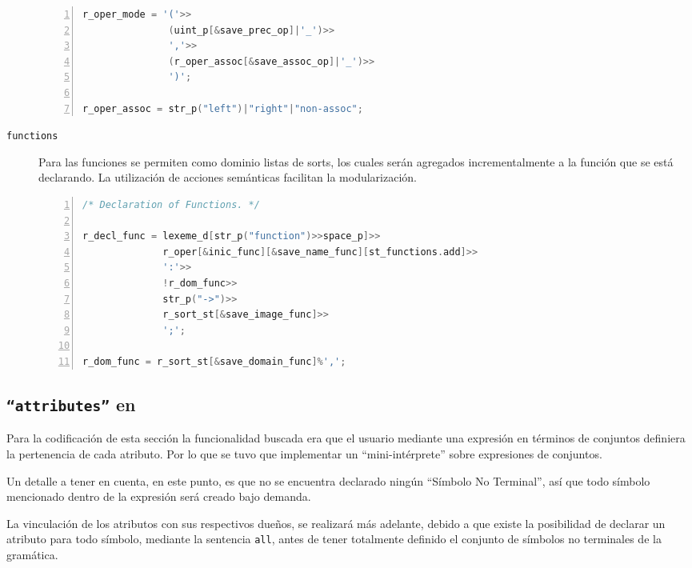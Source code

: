 \begin{description}
\begin{lstlisting}[language=C++, basicstyle=\scriptsize, numbers=left, numbersep=5pt, numberstyle=\tiny]
r_oper_mode = '('>>
               (uint_p[&save_prec_op]|'_')>>
               ','>>
               (r_oper_assoc[&save_assoc_op]|'_')>>
               ')';

r_oper_assoc = str_p("left")|"right"|"non-assoc";
\end{lstlisting}

\item [\texttt{functions}] Para las funciones se permiten como dominio listas de sorts, los cuales serán agregados incrementalmente a la función que se está declarando. La utilización de acciones semánticas facilitan la modularización.

\begin{lstlisting}[language=C++, basicstyle=\scriptsize, numbers=left, numbersep=5pt, numberstyle=\tiny]
/* Declaration of Functions. */

r_decl_func = lexeme_d[str_p("function")>>space_p]>>
              r_oper[&inic_func][&save_name_func][st_functions.add]>>
              ':'>>
              !r_dom_func>>
              str_p("->")>>
              r_sort_st[&save_image_func]>>
              ';';

r_dom_func = r_sort_st[&save_domain_func]%',';
\end{lstlisting}
\end{description}

\subsection{\texttt{``attributes''} en \spirit }

Para la codificación de esta sección la funcionalidad buscada era que el usuario mediante una expresión en términos de conjuntos definiera la pertenencia de cada atributo. Por lo que se tuvo que implementar un ``mini-intérprete'' sobre expresiones de conjuntos.

Un detalle a tener en cuenta, en este punto, es que no se encuentra declarado ningún ``Símbolo No Terminal'', así que todo símbolo mencionado dentro de la expresión será creado bajo demanda.

La vinculación de los atributos con sus respectivos dueños, se realizará más adelante, debido a que existe la posibilidad de declarar un atributo para todo símbolo, mediante la sentencia \texttt{all}, antes de tener totalmente definido el conjunto de símbolos no terminales de la gramática.

